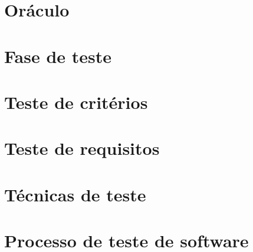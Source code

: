 \documentclass[utf8, usepdftitle=false, svgnames, color={table,
fixpdftex, hyperref, fixinclude, xcdraw}, t, brazil]{beamer}
\begin{document}
\section{Oráculo}

 
\section{Fase de teste}

 
\section{Teste de critérios}

 
\section{Teste de requisitos}


\section{Técnicas de teste}
 
 
\section{Processo de teste de software}
 
 
%  
%  
% 
%  
%  
%   
 
\end{document}
